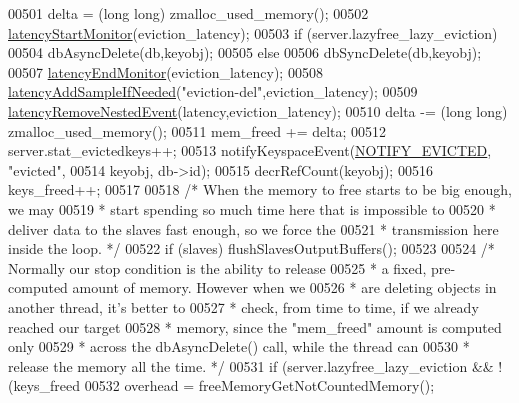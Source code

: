 \begin{DoxyCode}
00501             delta = (\textcolor{keywordtype}{long} \textcolor{keywordtype}{long}) zmalloc\_used\_memory();
00502             \hyperlink{latency_8h_a87d7b5b368dad97457f13466d760b0e1}{latencyStartMonitor}(eviction\_latency);
00503             \textcolor{keywordflow}{if} (server.lazyfree\_lazy\_eviction)
00504                 dbAsyncDelete(db,keyobj);
00505             \textcolor{keywordflow}{else}
00506                 dbSyncDelete(db,keyobj);
00507             \hyperlink{latency_8h_a88461aee20da0a648fe3332b5f068df7}{latencyEndMonitor}(eviction\_latency);
00508             \hyperlink{latency_8h_a77922ab34035890c90f98831a9071359}{latencyAddSampleIfNeeded}(\textcolor{stringliteral}{"eviction-del"},eviction\_latency);
00509             \hyperlink{latency_8h_a5a61a1e8705dbbb0dfbdf016fe32c6e4}{latencyRemoveNestedEvent}(latency,eviction\_latency);
00510             delta -= (\textcolor{keywordtype}{long} \textcolor{keywordtype}{long}) zmalloc\_used\_memory();
00511             mem\_freed += delta;
00512             server.stat\_evictedkeys++;
00513             notifyKeyspaceEvent(\hyperlink{server_8h_aefeeae0f3ac953537135a902b17bf63d}{NOTIFY\_EVICTED}, \textcolor{stringliteral}{"evicted"},
00514                 keyobj, db->id);
00515             decrRefCount(keyobj);
00516             keys\_freed++;
00517 
00518             \textcolor{comment}{/* When the memory to free starts to be big enough, we may}
00519 \textcolor{comment}{             * start spending so much time here that is impossible to}
00520 \textcolor{comment}{             * deliver data to the slaves fast enough, so we force the}
00521 \textcolor{comment}{             * transmission here inside the loop. */}
00522             \textcolor{keywordflow}{if} (slaves) flushSlavesOutputBuffers();
00523 
00524             \textcolor{comment}{/* Normally our stop condition is the ability to release}
00525 \textcolor{comment}{             * a fixed, pre-computed amount of memory. However when we}
00526 \textcolor{comment}{             * are deleting objects in another thread, it's better to}
00527 \textcolor{comment}{             * check, from time to time, if we already reached our target}
00528 \textcolor{comment}{             * memory, since the "mem\_freed" amount is computed only}
00529 \textcolor{comment}{             * across the dbAsyncDelete() call, while the thread can}
00530 \textcolor{comment}{             * release the memory all the time. */}
00531             \textcolor{keywordflow}{if} (server.lazyfree\_lazy\_eviction && !(keys\_freed %
00532                 overhead = freeMemoryGetNotCountedMemory();

\end{DoxyCode}
